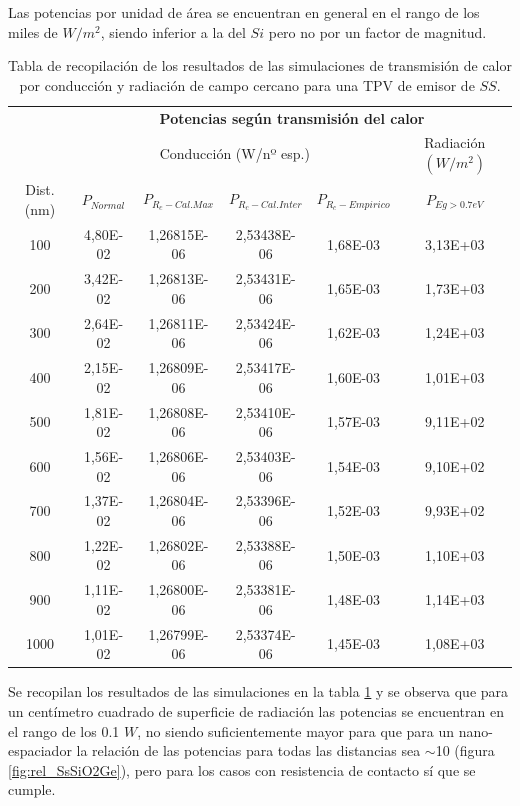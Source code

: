 Las potencias por unidad de área se encuentran en general en el rango de los miles de $W/m^2$, siendo inferior a la del $Si$ pero no por un factor de magnitud.
\begin{table}[H]
	\centering
		\begin{tabular}{|c||c|c|c|c||c|}
		\hline
		\multirow{2}{*}{ }& \multicolumn{5}{c|}{\textbf{\large Potencias según transmisión del calor}}\\ \cline{2-6}
& \multicolumn{4}{c||}{Conducción (W/nº esp.)}& Radiación $(W/m^2)$\\ \hline
Dist. (nm)&$P_{Normal}$&$P_{R_c-Cal.Max}$&$P_{R_c-Cal.Inter}$&$P_{R_c-Empirico}$&$P_{Eg>0.7eV}$\\ \hline \hline
100&4,80E-02&1,26815E-06&2,53438E-06&1,68E-03&3,13E+03\\ \hline 
200&3,42E-02&1,26813E-06&2,53431E-06&1,65E-03&1,73E+03\\ \hline 
300&2,64E-02&1,26811E-06&2,53424E-06&1,62E-03&1,24E+03\\ \hline 
400&2,15E-02&1,26809E-06&2,53417E-06&1,60E-03&1,01E+03\\ \hline 
500&1,81E-02&1,26808E-06&2,53410E-06&1,57E-03&9,11E+02\\ \hline 
600&1,56E-02&1,26806E-06&2,53403E-06&1,54E-03&9,10E+02\\ \hline 
700&1,37E-02&1,26804E-06&2,53396E-06&1,52E-03&9,93E+02\\ \hline 
800&1,22E-02&1,26802E-06&2,53388E-06&1,50E-03&1,10E+03\\ \hline 
900&1,11E-02&1,26800E-06&2,53381E-06&1,48E-03&1,14E+03\\ \hline 
1000&1,01E-02&1,26799E-06&2,53374E-06&1,45E-03&1,08E+03\\ \hline 
		\end{tabular}
	\caption{Tabla de recopilación de los resultados de las simulaciones de transmisión de calor por conducción y radiación de campo cercano para una TPV de emisor de $SS$.}
	\label{tab:SsSiO2Ge}
\end{table}
 Se recopilan los resultados de las simulaciones en la tabla \ref{tab:SsSiO2Ge} y se observa que para un centímetro cuadrado de superficie de radiación las potencias se encuentran en el rango de los 0.1 $W$, no siendo suficientemente mayor para que para un nano-espaciador la relación de las potencias para todas las distancias sea $\sim$10 (figura \ref{fig:rel_SsSiO2Ge}), pero para los casos con resistencia de contacto sí que se cumple. 
